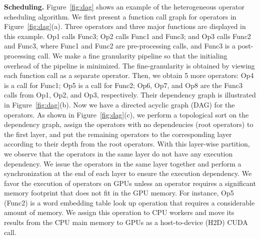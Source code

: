 \documentclass[sigconf]{acmart}
\begin{document}
\textbf{Scheduling.} 
Figure~\ref{fig:dag} shows an example of the heterogeneous operator scheduling algorithm. 
We first present a function call graph for operators in Figure~\ref{fig:dag}(a). 
Three operators and three major functions are displayed in this example. 
Op1 calls Func3; Op2 calls Func1 and Func3; and Op3 calls Func2 and Func3, where Func1 and Func2 are pre-processing calls, and Func3 is a post-processing call. We make a fine granularity pipeline so that the initialing overhead of the pipeline is minimized. The fine-granularity is obtained by viewing each function call as a separate operator. Then, we obtain 5 more operators: Op4 is a call for Func1; Op5 is a call for Func2; Op6, Op7, and Op8 are the Func3 calls from Op1, Op2, and Op3, respectively. Their dependency graph is illustrated in Figure~\ref{fig:dag}(b). Now we have a directed acyclic graph (DAG) for the operators. As shown in Figure~\ref{fig:dag}(c), we perform a topological sort on the dependency graph, assign the operators with no dependencies (root operators) to the first layer, and put the remaining operators to the corresponding layer according to their depth from the root operators. With this layer-wise partition, we observe that the operators in the same layer do not have any execution dependency. We issue the operators in the same layer together and perform a synchronization at the end of each layer to ensure the execution dependency. 
We favor the execution of operators on GPUs unless an operator requires a significant memory footprint that does not fit in the GPU memory. 
For instance, Op5 (Func2) is a word embedding table look up operation that requires a considerable amount of memory. We assign this operation to CPU workers and move its results from the CPU main memory to GPUs as a host-to-device (H2D) CUDA call.


\begin{table}[htbp]
\caption{The kernel launching overhead with an empty kernel on Nvidia Tesla V100-SXM2-32GB.}
\label{tbl:launch}
\centering
\normalsize
{}
\end{table}
\end{document}
